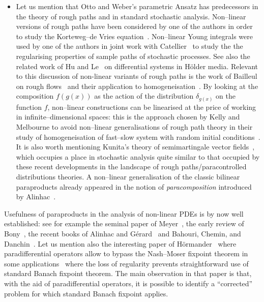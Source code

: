 \documentclass{amsart}
\newcommand{\tmtextit}[1]{{\itshape{#1}}}
\newenvironment{itemizedot}{\begin{itemize} \renewcommand{\labelitemi}{$\bullet$}\renewcommand{\labelitemii}{$\bullet$}\renewcommand{\labelitemiii}{$\bullet$}\renewcommand{\labelitemiv}{$\bullet$}}{\end{itemize}}
\theoremstyle{remark}
\theoremstyle{definition}
\begin{document}
\begin{itemizedot}
  \item Let us mention that Otto and Weber's parametric Ansatz has
  predecessors in the theory of rough paths and in standard stochastic
  analysis. Non--linear versions of rough paths have been considered by one of
  the authors in order to study the Korteweg--de Vries
  equation~{\cite{gubinelli_rough_2012}}. Non--linear Young integrals were
  used by one of the authors in joint work with
  Catellier~{\cite{catellier_averaging_2016}} to study the the regularising
  properties of sample paths of stochastic processes. See also the related
  work of Hu and Le~{\cite{hu_nonlinear_2014}} on differential systems in
  H{\"o}lder media. Relevant to this discussion of non-linear variants of
  rough paths is the work of Bailleul on rough
  flows~{\cite{bailleul_flows_2015}} and their application to
  homogeneisation~{\cite{bailleul_rough_2016}}. By looking at the composition
  $f (g (x))$ as the action of the distribution $\delta_{g (x)}$ on the
  function $f$, non--linear constructions can be linearised at the price of
  working in infinite--dimensional spaces: this is the approach chosen by
  Kelly and Melbourne to avoid non--linear generalisations of rough path
  theory in their study of homogeneisation of fast--slow system with random
  initial conditions~{\cite{kelly_deterministic_2014}}. It is also worth
  mentioning Kunita's theory of semimartingale vector
  fields~{\cite{kunita_stochastic_1984}}, which occupies a place in stochastic
  analysis quite similar to that occupied by these recent developments in the
  landscape of rough paths/paracontrolled distributions theories. A
  non--linear generalisation of the classic bilinear paraproducts already
  appeared in the notion of \tmtextit{paracomposition} introduced by
  Alinhac~{\cite{bony_microlocal_1991}}.
\end{itemizedot}


Usefulness of paraproducts in the analysis of non-linear PDEs is by now well
established: see for example the seminal paper of
Meyer~{\cite{meyer_remarques_1981}}, the early review of
Bony~{\cite{bony_microlocal_1991}}, the recent books of Alinhac and
G{\'e}rard~{\cite{alinhac_operateurs_1991}} and Bahouri, Chemin, and
Danchin~{\cite{bahouri_fourier_2011}}. Let us mention also the interesting
paper of H{\"o}rmander~{\cite{hormander_nash_moser_1990}} where
paradifferential operators allow to bypass the Nash--Moser fixpoint theorem in
some applications \ where the loss of regularity prevents straightforward use
of standard Banach fixpoint theorem. The main observation in that paper is
that, with the aid of paradifferential operators, it is possible to identify a
``corrected'' problem for which standard Banach fixpoint applies.
\end{document}
